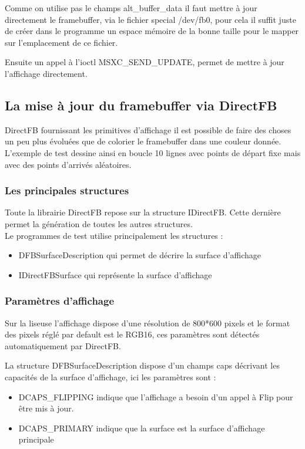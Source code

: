 Comme on utilise pas le champs alt_buffer_data il faut mettre à jour directement le framebuffer, via le fichier special /dev/fb0, pour cela il suffit juste de créer dans le programme un espace mémoire de la bonne taille pour le mapper sur l'emplacement de ce fichier.

Ensuite un appel à l'ioctl MSXC_SEND_UPDATE, permet de mettre à jour l'affichage directement.

\subsection{La mise à jour du framebuffer via DirectFB}

DirectFB fournissant les primitives d'affichage il est possible de faire des choses un peu plus
évoluées que de colorier le framebuffer dans une couleur donnée.
L'exemple de test dessine ainsi en boucle 10 lignes avec points de départ fixe mais avec des points d'arrivés aléatoires.

\subsubsection{Les principales structures}

Toute la librairie DirectFB repose sur la structure IDirectFB. Cette dernière permet la génération de toutes les autres structures.~\\
 Le programmes de test utilise principalement les structures :
\begin{itemize}
	\item DFBSurfaceDescription qui permet de décrire la surface d'affichage
	\item IDirectFBSurface qui représente la surface d'affichage
\end{itemize}

\subsubsection{Paramètres d'affichage}

Sur la liseuse l'affichage dispose d'une résolution de 800*600 pixels et le format des pixels 
réglé par default est le RGB16, ces paramètres sont détectés automatiquement par DirectFB.

La structure DFBSurfaceDescription dispose d'un champs caps décrivant les capacités de la surface d'affichage, ici les paramètres sont : 
	\begin{itemize}
		\item DCAPS_FLIPPING
			indique que l'affichage a besoin d'un appel à Flip pour être mis à jour.
		\item DCAPS_PRIMARY
			indique que la surface est la surface d'affichage principale\\
	\end{itemize}

